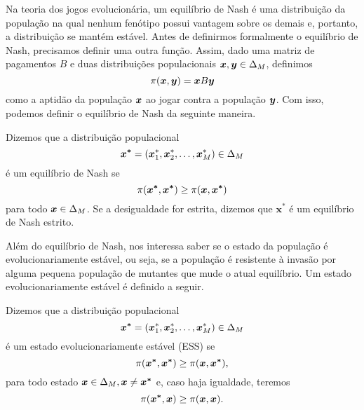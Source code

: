 Na teoria dos jogos evolucionária, um equilíbrio de Nash é uma distribuição da população na qual nenhum fenótipo possui vantagem sobre os demais e, portanto, a distribuição se mantém estável. Antes de definirmos formalmente o equilíbrio de Nash, precisamos definir uma outra função. Assim, dado uma matriz de pagamentos $B$ e duas distribuições populacionais $\boldsymbol{x},\boldsymbol{y}\in\Delta_M$, definimos
\begin{equation}
    \pi(\boldsymbol{x},\boldsymbol{y})=\boldsymbol{x}B\boldsymbol{y}
\end{equation}
como a aptidão da população $\boldsymbol{x}$ ao jogar contra a população $\boldsymbol{y}$. Com isso, podemos definir o equilíbrio de Nash da seguinte maneira.

\begin{definition}
    \label{eqNashJogosEvo}
    Dizemos que a distribuição populacional
    \begin{equation*}
        \boldsymbol{x^*}=(\boldsymbol{x}^*_{1},\boldsymbol{x}^*_{2},\dots,\boldsymbol{x}^*_{M})\in\Delta_M
    \end{equation*}
    é um equilíbrio de Nash se
    \begin{equation*}
        \pi(\boldsymbol{x^*},\boldsymbol{x^*})\geq \pi(\boldsymbol{x},\boldsymbol{x^*})
    \end{equation*}
    para todo $\boldsymbol{x}\in\Delta_{M}$. Se a desigualdade for estrita, dizemos que $\boldsymbol{x^*}$ é um equilíbrio de Nash estrito.
\end{definition}

Além do equilíbrio de Nash, nos interessa saber se o estado da população é evolucionariamente estável, ou seja, se a população é resistente à invasão por alguma pequena população de mutantes que mude o atual equilíbrio. Um estado evolucionariamente estável é definido a seguir.

\begin{definition}
    \label{defESS}
    Dizemos que a distribuição populacional
    \begin{equation*}
        \boldsymbol{x^*}=(\boldsymbol{x}^*_{1},\boldsymbol{x}^*_{2},\dots,\boldsymbol{x}^*_{M})\in\Delta_M
    \end{equation*}
    é um estado evolucionariamente estável (ESS) se
    \begin{equation*}
        \pi(\boldsymbol{x^*},\boldsymbol{x^*}) \geq \pi(\boldsymbol{x},\boldsymbol{x^*}),
    \end{equation*}
    para todo estado $\boldsymbol{x}\in\Delta_M,\boldsymbol{x}\neq\boldsymbol{x^*}$ e, caso haja igualdade, teremos
    \begin{equation*}
        \pi(\boldsymbol{x^*},\boldsymbol{x}) \geq \pi(\boldsymbol{x},\boldsymbol{x}).
    \end{equation*}
\end{definition}

